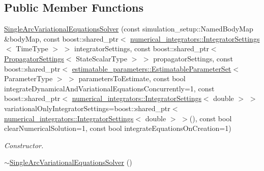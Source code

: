 \subsection*{Public Member Functions}
\begin{DoxyCompactItemize}
\item 
\hyperlink{classtudat_1_1propagators_1_1SingleArcVariationalEquationsSolver_afb32b4f7d1af10566135899132cb8629}{Single\+Arc\+Variational\+Equations\+Solver} (const simulation\+\_\+setup\+::\+Named\+Body\+Map \&body\+Map, const boost\+::shared\+\_\+ptr$<$ \hyperlink{classtudat_1_1numerical__integrators_1_1IntegratorSettings}{numerical\+\_\+integrators\+::\+Integrator\+Settings}$<$ Time\+Type $>$ $>$ integrator\+Settings, const boost\+::shared\+\_\+ptr$<$ \hyperlink{classtudat_1_1propagators_1_1PropagatorSettings}{Propagator\+Settings}$<$ State\+Scalar\+Type $>$ $>$ propagator\+Settings, const boost\+::shared\+\_\+ptr$<$ \hyperlink{classtudat_1_1estimatable__parameters_1_1EstimatableParameterSet}{estimatable\+\_\+parameters\+::\+Estimatable\+Parameter\+Set}$<$ Parameter\+Type $>$ $>$ parameters\+To\+Estimate, const bool integrate\+Dynamical\+And\+Variational\+Equations\+Concurrently=1, const boost\+::shared\+\_\+ptr$<$ \hyperlink{classtudat_1_1numerical__integrators_1_1IntegratorSettings}{numerical\+\_\+integrators\+::\+Integrator\+Settings}$<$ double $>$ $>$ variational\+Only\+Integrator\+Settings=boost\+::shared\+\_\+ptr$<$ \hyperlink{classtudat_1_1numerical__integrators_1_1IntegratorSettings}{numerical\+\_\+integrators\+::\+Integrator\+Settings}$<$ double $>$ $>$(), const bool clear\+Numerical\+Solution=1, const bool integrate\+Equations\+On\+Creation=1)
\begin{DoxyCompactList}\small\item\em Constructor. \end{DoxyCompactList}\item 
\hyperlink{classtudat_1_1propagators_1_1SingleArcVariationalEquationsSolver_a8e62a23e084fd527a1d871479c8b3b64}{$\sim$\+Single\+Arc\+Variational\+Equations\+Solver} ()\hypertarget{classtudat_1_1propagators_1_1SingleArcVariationalEquationsSolver_a8e62a23e084fd527a1d871479c8b3b64}{}\label{classtudat_1_1propagators_1_1SingleArcVariationalEquationsSolver_a8e62a23e084fd527a1d871479c8b3b64}


\end{DoxyCompactItemize}
